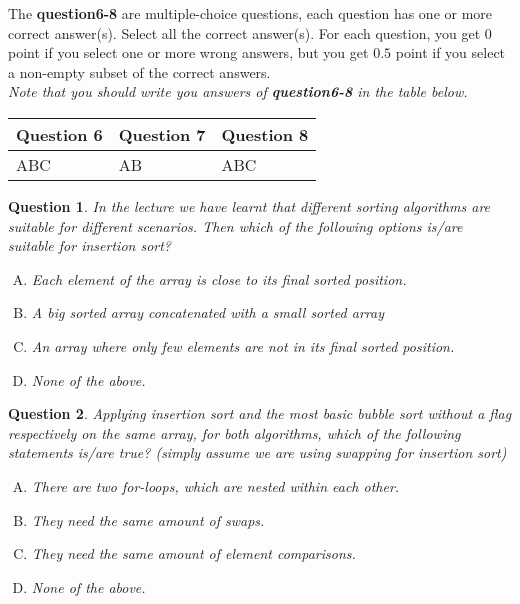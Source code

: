 \documentclass{article}
\newtheorem{Q}{Question}
\begin{document}
The \textbf{question6-8} are multiple-choice questions, each question has one or more correct answer(s). Select all the correct answer(s). For each question, you get $0$ point if you select one or more wrong answers, but you get $0.5$ point if you select a non-empty subset of the correct answers.\\
\textit{Note that you should write you answers of \textbf{question6-8} in the table below.}
\begin{table}[htbp]
	\begin{tabular}{|p{2cm}|p{2cm}|p{2cm}|}
		\hline
		Question 6 & Question 7 & Question 8 \\
		\hline
		ABC        & AB         & ABC        \\
		\hline
	\end{tabular}
\end{table}

\begin{Q}
	In the lecture we have learnt that different sorting algorithms are suitable for different scenarios. Then which of the following options is/are suitable for insertion sort?
	\begin{enumerate}[(A)]
		\item Each element of the array is close to its final sorted position.
		\item A big sorted array concatenated with a small sorted array
		\item An array where only few elements are not in its final sorted position.
		\item None of the above.
	\end{enumerate}
\end{Q}

\begin{Q}
	Applying insertion sort and the most basic bubble sort without a flag respectively on the same array, for both algorithms, which of the following statements is/are true? (simply assume we are using swapping for insertion sort)
	\begin{enumerate}[(A)]
		\item There are two for-loops, which are nested within each other.
		\item They need the same amount of swaps.
		\item They need the same amount of element comparisons.
		\item None of the above.
	\end{enumerate}
\end{Q}
\end{document}
